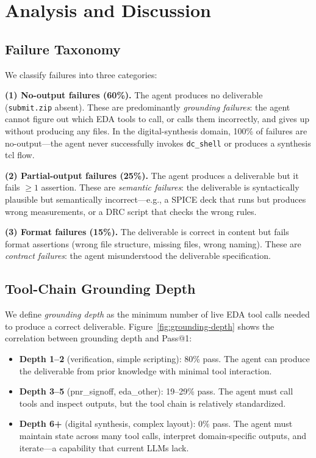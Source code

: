 \section{Analysis and Discussion}
\label{sec:analysis}

\subsection{Failure Taxonomy}
\label{sec:failure-taxonomy}

We classify failures into three categories:

\textbf{(1) No-output failures (60\%).} The agent produces no deliverable (\texttt{submit.zip} absent). These are predominantly \emph{grounding failures}: the agent cannot figure out which EDA tools to call, or calls them incorrectly, and gives up without producing any files. In the digital-synthesis domain, 100\% of failures are no-output---the agent never successfully invokes \texttt{dc\_shell} or produces a synthesis tcl flow.

\textbf{(2) Partial-output failures (25\%).} The agent produces a deliverable but it fails $\geq 1$ assertion. These are \emph{semantic failures}: the deliverable is syntactically plausible but semantically incorrect---e.g., a SPICE deck that runs but produces wrong measurements, or a DRC script that checks the wrong rules.

\textbf{(3) Format failures (15\%).} The deliverable is correct in content but fails format assertions (wrong file structure, missing files, wrong naming). These are \emph{contract failures}: the agent misunderstood the deliverable specification.

\subsection{Tool-Chain Grounding Depth}
\label{sec:grounding-depth}

We define \emph{grounding depth} as the minimum number of live EDA tool calls needed to produce a correct deliverable. Figure~\ref{fig:grounding-depth} shows the correlation between grounding depth and Pass@1:

\begin{itemize}
    \item \textbf{Depth 1--2} (verification, simple scripting): 80\% pass. The agent can produce the deliverable from prior knowledge with minimal tool interaction.
    \item \textbf{Depth 3--5} (pnr\_signoff, eda\_other): 19--29\% pass. The agent must call tools and inspect outputs, but the tool chain is relatively standardized.
    \item \textbf{Depth 6+} (digital synthesis, complex layout): 0\% pass. The agent must maintain state across many tool calls, interpret domain-specific outputs, and iterate---a capability that current LLMs lack.
\end{itemize}

